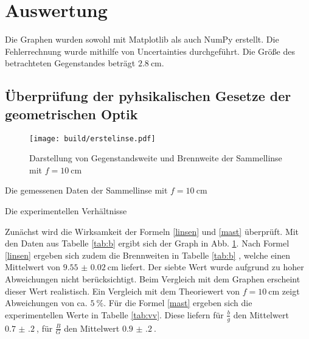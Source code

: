 \section{Auswertung}
\label{sec:Auswertung}


Die Graphen wurden sowohl mit Matplotlib \cite{matplotlib} als auch NumPy \cite{numpy} erstellt. Die
Fehlerrechnung wurde mithilfe von Uncertainties \cite{uncertainties} durchgeführt.
 Die Größe des betrachteten Gegenstandes beträgt $\SI{2.8}{\centi\meter}$.



\subsection{Überprüfung der pyhsikalischen Gesetze der geometrischen Optik}

\begin{figure}
 \centering
 \texttt{[image: build/erstelinse.pdf]}
 \caption{Darstellung von Gegenstandsweite und Brennweite der Sammellinse mit $f = \SI{10}{\centi\meter}$}
 \label{fig:erste}
\end{figure}

\begin{table}
	\centering
	\caption{Die gemessenen Daten der Sammellinse mit $f = \SI{10}{\centi\meter}$}
	
	\label{tab:b}
\end{table}

\begin{table}
	\centering
	\caption{Die experimentellen Verhältnisse}
	
	\label{tab:vv}
\end{table}

Zunächst wird die Wirksamkeit der Formeln \eqref{linsen} und \eqref{mast} überprüft.
Mit den Daten aus Tabelle \ref{tab:b} ergibt sich der Graph in Abb. \ref{fig:erste}. Nach Formel \eqref{linsen} ergeben sich zudem die Brennweiten in Tabelle \ref{tab:b}
, welche einen Mittelwert von $\SI{9.55(2)}{\centi\meter}$ liefert. Der siebte Wert wurde aufgrund zu hoher Abweichungen nicht berücksichtigt. Beim Vergleich mit dem Graphen erscheint dieser Wert realistisch. Ein Vergleich mit dem Theoriewert von $f = \SI{10}{\centi\meter}$ zeigt Abweichungen von ca. $\SI{5}{\percent}$.
Für die Formel \eqref{mast} ergeben sich die experimentellen Werte in Tabelle \ref{tab:vv}. Diese liefern für $\frac{b}{g}$ den Mittelwert
$\SI{0.7(2)}{}$, für $\frac{B}{G}$ den Mittelwert $\SI{0.9(2)}{}$.



